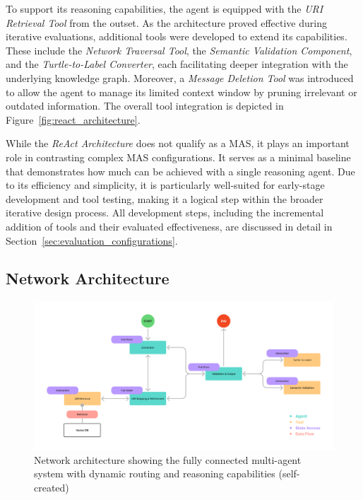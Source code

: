 \documentclass[a4paper,oneside,bibliography=totoc]{scrbook}
\begin{document}
To support its reasoning capabilities, the agent is equipped with the \textit{URI Retrieval Tool} from the outset. As the architecture proved effective during iterative evaluations, additional tools were developed to extend its capabilities. These include the \textit{Network Traversal Tool}, the \textit{Semantic Validation Component}, and the \textit{Turtle-to-Label Converter}, each facilitating deeper integration with the underlying knowledge graph. Moreover, a \textit{Message Deletion Tool} was introduced to allow the agent to manage its limited context window by pruning irrelevant or outdated information. The overall tool integration is depicted in Figure~\ref{fig:react_architecture}.

While the \textit{ReAct Architecture} does not qualify as a \ac{MAS}, it plays an important role in contrasting complex \ac{MAS} configurations. It serves as a minimal baseline that demonstrates how much can be achieved with a single reasoning agent. Due to its efficiency and simplicity, it is particularly well-suited for early-stage development and tool testing, making it a logical step within the broader iterative design process. All development steps, including the incremental addition of tools and their evaluated effectiveness, are discussed in detail in Section~\ref{sec:evaluation_configurations}.

\subsection{Network Architecture}
\label{subsec:network}

\begin{figure}[tp]
  \centering
  \includegraphics[width=\textwidth]{figures/Network Architecture.png}
  \caption[Network architecture showing the fully connected multi-agent system with dynamic routing and reasoning capabilities]{Network architecture showing the fully connected multi-agent system with dynamic routing and reasoning capabilities (self-created)}
  \label{fig:network_architecture}
\end{figure}
\end{document}
